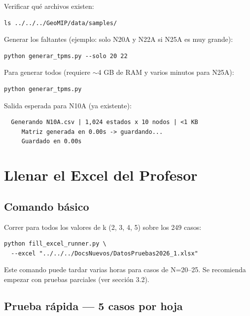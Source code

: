 \documentclass[12pt,a4paper]{article}
\begin{document}
Verificar qué archivos existen:
\begin{lstlisting}
ls ../../../GeoMIP/data/samples/
\end{lstlisting}

Generar los faltantes (ejemplo: solo N20A y N22A si N25A es muy grande):
\begin{lstlisting}
python generar_tpms.py --solo 20 22
\end{lstlisting}

Para generar todos (requiere $\sim$4 GB de RAM y varios minutos para N25A):
\begin{lstlisting}
python generar_tpms.py
\end{lstlisting}

\begin{successbox}
Salida esperada para N10A (ya existente):
\begin{verbatim}
  Generando N10A.csv | 1,024 estados x 10 nodos | <1 KB
     Matriz generada en 0.00s -> guardando...
     Guardado en 0.00s
\end{verbatim}
\end{successbox}

\section{Llenar el Excel del Profesor}

\subsection{Comando básico}

Correr para todos los valores de k (2, 3, 4, 5) sobre los 249 casos:

\begin{lstlisting}
python fill_excel_runner.py \
  --excel "../../../DocsNuevos/DatosPruebas2026_1.xlsx"
\end{lstlisting}

\begin{notebox}
Este comando puede tardar varias horas para casos de N=20--25. Se recomienda empezar con pruebas parciales (ver sección 3.2).
\end{notebox}

\subsection{Prueba rápida — 5 casos por hoja}
\end{document}
